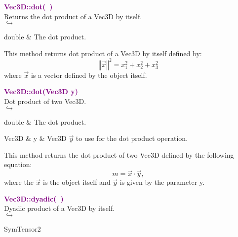 \textcolor{purple}{\textbf{Vec3D::dot(~)}}\label{Vec3D::dot()}\\
Returns the dot product of a Vec3D by itself.\\ \hspace*{5mm}$\hookrightarrow$
\vspace*{-2em}\begin{tcolorbox}[grow to left by=-1cm, width=\textwidth-1cm,myArgs,tabularx={l|R}]
double & The dot product.
\end{tcolorbox}

This method returns dot product of a Vec3D by itself defined by:
\begin{equation*}
\left\Vert \overrightarrow{x} \right\Vert^2  = x_{1}^2 + x_{2}^2 + x_{3}^2
\end{equation*}
where $\overrightarrow{x}$ is a vector defined by the object itself.

\textcolor{purple}{\textbf{Vec3D::dot(Vec3D y)}}\label{Vec3D::dot(Vec3D y)}\\
Dot product of two Vec3D.\\ \hspace*{5mm}$\hookrightarrow$
\vspace*{-2em}\begin{tcolorbox}[grow to left by=-1cm, width=\textwidth-1cm,myArgs,tabularx={l|R}]
double & The dot product.
\end{tcolorbox}

\begin{tcolorbox}[width=\textwidth,myArgs,tabularx={ll|R}]
Vec3D & y & Vec3D $\overrightarrow{y}$ to use for the dot product operation.
\end{tcolorbox}

This method returns the dot product of two Vec3D defined by the following equation:
\begin{equation*}
m = \overrightarrow{x}\cdot\overrightarrow{y},
\end{equation*}
where the $\overrightarrow{x}$ is the object itself and $\overrightarrow{y}$ is given by the parameter y.

\textcolor{purple}{\textbf{Vec3D::dyadic(~)}}\label{Vec3D::dyadic()}\\
Dyadic product of a Vec3D by itself.\\ \hspace*{5mm}$\hookrightarrow$
\vspace*{-2em}\begin{tcolorbox}[grow to left by=-1cm, width=\textwidth-1cm,myArgs,tabularx={l|R}]
SymTensor2
\end{tcolorbox}

